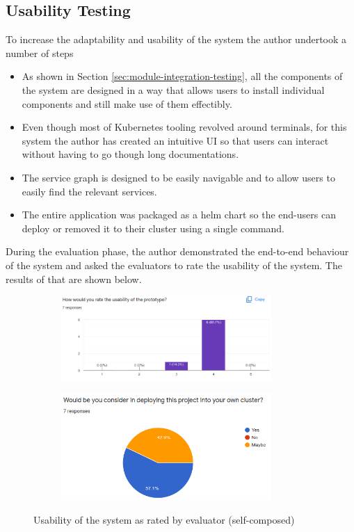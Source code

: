 \subsection{Usability Testing}

To increase the adaptability and usability of the system the author undertook a number of steps

\begin{itemize}
    \item As shown in Section \ref{sec:module-integration-testing}, all the components of the system are designed in a way that allows users to install individual components and still make use of them effectibly.
    \item Even though most of Kubernetes tooling revolved around terminals, for this system the author has created an intuitive UI so that users can interact without having to go though long documentations.
    \item The service graph is designed to be easily navigable and to allow users to easily find the relevant services.
    \item The entire application was packaged as a helm chart so the end-users can deploy or removed it to their cluster using a single command.

\end{itemize}

\noindent During the evaluation phase, the author demonstrated the end-to-end behaviour of the system and asked the evaluators to rate the usability of the system. The results of that are shown below.


\begin{figure}[H]
    \centering
    \begin{subfigure}[bH]{0.49\textwidth}
        \centering
        \includegraphics[width=8cm]{assets/testing/usability.png}
    \end{subfigure}
    \hfill
    \begin{subfigure}[bH]{0.49\textwidth}
        \centering
        \includegraphics[width=8cm]{assets/testing/use-or-not.png}
    \end{subfigure}
    \hfill
    \caption{Usability of the system as rated by evaluator (self-composed)}
\end{figure}




